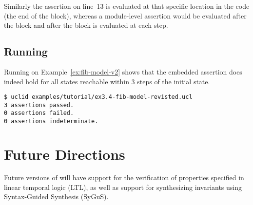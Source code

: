 Similarly the assertion on line~13 is evaluated at that specific location in the code (the end of the  block), whereas a module-level assertion would be evaluated after the  block and after the  block is evaluated at each step.

\subsection{Running \uclid{}}

Running \uclid{} on Example~\ref{ex:fib-model-v2} shows that the embedded assertion does indeed hold for all states reachable within 3 steps of the initial state.

\begin{Verbatim}[frame=single, samepage=true]
$ uclid examples/tutorial/ex3.4-fib-model-revisted.ucl 
3 assertions passed.
0 assertions failed.
0 assertions indeterminate.
\end{Verbatim}

\section{Future Directions}

Future versions of \uclid{} will have support for the verification of properties specified in linear temporal logic (LTL), as well as support for synthesizing invariants using Syntax-Guided Synthesis (SyGuS).
